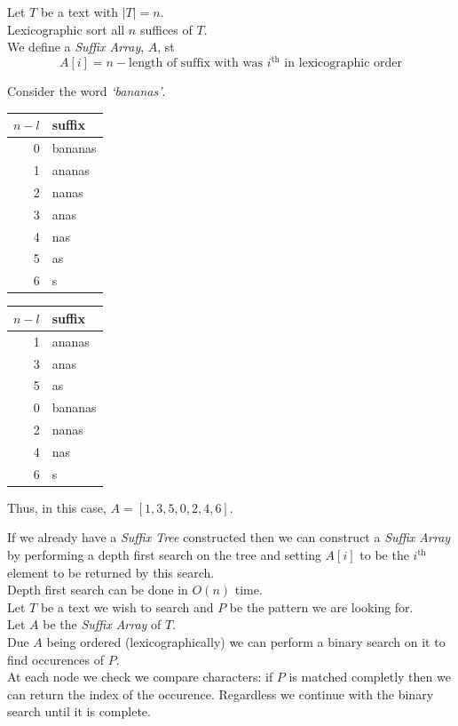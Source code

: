 \documentclass[11pt,a4paper]{article}
\begin{document}
Let $T$ be a text with $|T|=n$.\\
Lexicographic sort all $n$ suffices of $T$.\\
We define a \textit{Suffix Array}, $A$, st
$$A[i]=n-\text{length of suffix with was }i^\text{th}\text{ in lexicographic order}$$

Consider the word \textit{`bananas'}.
\begin{center}
\begin{tabular}{|r|l|}
\hline
$n-l$&\textbf{suffix}\\\hline
0&bananas\\
1&ananas\\
2&nanas\\
3&anas\\
4&nas\\
5&as\\
6&s\\
\hline
\end{tabular}\quad
\begin{tabular}{|r|l|}
\hline
$n-l$&\textbf{suffix}\\\hline
\hline
1&ananas\\
3&anas\\
5&as\\
0&bananas\\
2&nanas\\
4&nas\\
6&s\\
\hline
\end{tabular}
\end{center}
Thus, in this case, $A=[1,3,5,0,2,4,6]$.\\


If we already have a \textit{Suffix Tree} constructed then we can construct a \textit{Suffix Array} by performing a depth first search on the tree and setting $A[i]$ to be the $i^\text{th}$ element to be returned by this search.\\
\nb Depth first search can be done in $O(n)$ time.\\

Let $T$ be a text we wish to search and $P$ be the pattern we are looking for.\\
Let $A$ be the \textit{Suffix Array} of $T$.\\
Due $A$ being ordered (lexicographically) we can perform a binary search on it to find occurences of $P$.\\
At each node we check we compare characters: if $P$ is matched completly then we can return the index of the occurence. Regardless we continue with the binary search until it is complete.\\
\end{document}
